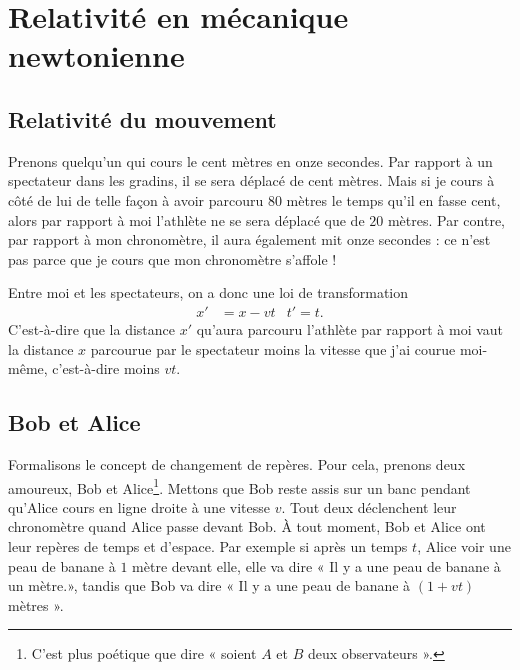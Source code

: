 
\section{Relativité en mécanique newtonienne}

\subsection{Relativité du mouvement}

Prenons quelqu'un qui cours le cent mètres en onze secondes. Par rapport à un spectateur dans les gradins, il se sera déplacé de cent mètres. Mais si je cours à côté de lui de telle façon à avoir parcouru \( 80\) mètres le temps qu'il en fasse cent, alors par rapport à moi l'athlète ne se sera déplacé que de \( 20\) mètres. Par contre, par rapport à mon chronomètre, il aura également mit onze secondes : ce n'est pas parce que je cours que mon chronomètre s'affole !

Entre moi et les spectateurs, on a donc une loi de transformation
\begin{align}		\label{EqTransGal}
	x' & =x-vt & t'=t.
\end{align}
C'est-à-dire que la distance \( x'\) qu'aura parcouru l'athlète par rapport à moi vaut la distance \( x\) parcourue par le spectateur moins la vitesse que j'ai courue moi-même, c'est-à-dire moins \( vt\).

\subsection{Bob et Alice}

Formalisons le concept de changement de repères. Pour cela, prenons deux amoureux, Bob et Alice\footnote{C'est plus poétique que dire « soient \( A\) et \( B\) deux observateurs ».}. Mettons que Bob reste assis sur un banc pendant qu'Alice cours en ligne droite à une vitesse \( v\). Tout deux déclenchent leur chronomètre quand Alice passe devant Bob. À tout moment, Bob et Alice ont leur repères de temps et d'espace. Par exemple si après un temps \( t\), Alice voir une peau de banane à \( 1\) mètre devant elle, elle va dire « Il y a une peau de banane à un mètre.», tandis que Bob va dire « Il y a une peau de banane à \( (1+vt)\) mètres ».

